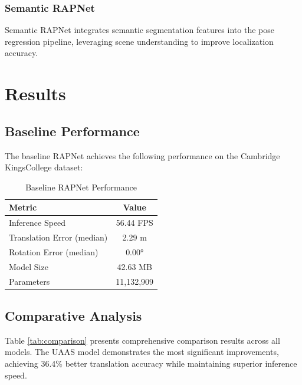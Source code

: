 \documentclass[11pt,a4paper]{article}
\begin{document}
\subsubsection{Semantic RAPNet}
Semantic RAPNet integrates semantic segmentation features into the pose regression pipeline, leveraging scene understanding to improve localization accuracy.

\section{Results}

\subsection{Baseline Performance}

The baseline RAPNet achieves the following performance on the Cambridge KingsCollege dataset:

\begin{table}[h]
\centering
\caption{Baseline RAPNet Performance}
\label{tab:baseline}
\begin{tabular}{lc}
\toprule
\textbf{Metric} & \textbf{Value} \\
\midrule
Inference Speed & 56.44 FPS \\
Translation Error (median) & 2.29 m \\
Rotation Error (median) & 0.00° \\
Model Size & 42.63 MB \\
Parameters & 11,132,909 \\
\bottomrule
\end{tabular}
\end{table}

\subsection{Comparative Analysis}

Table \ref{tab:comparison} presents comprehensive comparison results across all models. The UAAS model demonstrates the most significant improvements, achieving 36.4\% better translation accuracy while maintaining superior inference speed.

\begin{table}[h]
\centering
\caption{Performance Comparison Across Models}
\label{tab:comparison}
\end{table}
\end{document}
